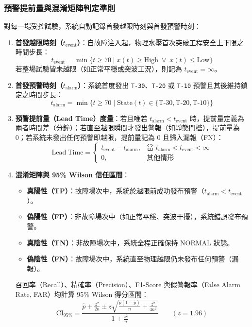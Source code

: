 \documentclass[fontset=none, a4paper, 12pt]{ctexart}
\begin{document}
\begin{doublespace}
\subsubsection{預警提前量與混淆矩陣判定準則}
對每一場受控試驗，系統自動記錄首發越限時刻與首發預警時刻：
\begin{enumerate}
    \item \textbf{首發越限時刻（$t_{\mathrm{event}}$）}：自故障注入起，物理水壓首次突破工程安全上下限之時間步長：
    \begin{equation}
        t_{\mathrm{event}} = \min \bigl\{ t \ge 70 \;\big|\; x(t) \ge \mathrm{High} \;\lor\; x(t) \le \mathrm{Low} \bigr\}
    \end{equation}
    若整場試驗皆未越限（如正常平穩或突波工況），則記為 $t_{\mathrm{event}} = \infty$。
    \item \textbf{首發預警時刻（$t_{\mathrm{alarm}}$）}：系統首度發出 \texttt{T-30}、\texttt{T-20} 或 \texttt{T-10} 預警且其後維持鎖定之時間步長：
    \begin{equation}
        t_{\mathrm{alarm}} = \min \bigl\{ t \ge 70 \;\big|\; \text{State}(t) \in \{\text{T-30}, \text{T-20}, \text{T-10}\} \bigr\}
    \end{equation}
    \item \textbf{預警提前量（Lead Time）度量}：若且唯若 $t_{\mathrm{alarm}} < t_{\mathrm{event}}$ 時，提前量定義為兩者時間差（分鐘）；若直至越限瞬間才發出警報（如靜態門檻），提前量為 0；若系統未發出任何預警即越限，提前量記為 0 且歸入漏報（FN）：
    \begin{equation}
        \mathrm{Lead\ Time} = \begin{cases}
            t_{\mathrm{event}} - t_{\mathrm{alarm}}, & \text{當 } t_{\mathrm{alarm}} < t_{\mathrm{event}} < \infty \\
            0, & \text{其他情形}
        \end{cases}
        \label{eq:lead_time_def}
    \end{equation}
    \item \textbf{混淆矩陣與 95\% Wilson 信任區間}：
    \begin{itemize}
        \item \textbf{真陽性（TP）}：故障場次中，系統於越限前成功發布預警（$t_{\mathrm{alarm}} < t_{\mathrm{event}}$）。
        \item \textbf{偽陽性（FP）}：非故障場次中（如正常平穩、突波干擾），系統錯誤發布預警。
        \item \textbf{真陰性（TN）}：非故障場次中，系統全程正確保持 NORMAL 狀態。
        \item \textbf{偽陰性（FN）}：故障場次中，系統直至物理越限仍未發布任何預警（漏報）。
    \end{itemize}
    召回率（Recall）、精確率（Precision）、F1-Score 與假警報率（False Alarm Rate, FAR）均計算 95\% Wilson 得分區間：
    \begin{equation}
        \mathrm{CI}_{95\%} = \frac{\hat{p} + \frac{z^2}{2n} \pm z\sqrt{\frac{\hat{p}(1-\hat{p})}{n} + \frac{z^2}{4n^2}}}{1 + \frac{z^2}{n}} \qquad (z = 1.96)
    \end{equation}
\end{enumerate}


\end{doublespace}
\end{document}
